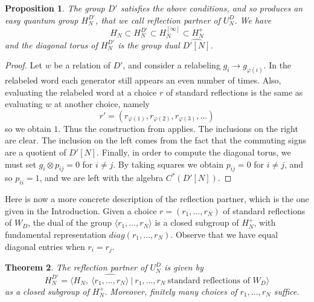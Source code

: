 \documentclass[11pt,a4paper]{article}
\newtheorem{thm}{Theorem}[section]
\newtheorem{prop}[thm]{Proposition}
\begin{document}
\begin{prop}\label{partner-exists}
The group $D'$ satisfies the above conditions, and so produces an easy quantum group $H_N^{D'}$, that we call reflection partner of $U_N^D$. We have
\[
 H_N\subset H_N^{D'}\subset H_N^{[\infty]}\subset H_N^+
\]
and the diagonal torus of $H_N^{D'}$ is the group dual $\widehat{D'[N]}$.
\end{prop}

\begin{proof}
Let $w$ be a relation of $D'$, and consider a relabeling $g_i\to g_{\varphi(i)}$. In the relabeled word each generator still appears an even number of times. Also, evaluating the relabeled word at a choice $r$ of standard reflections is the same as evaluating $w$ at another choice, namely
\[
 r'=(r_{\varphi(1)},r_{\varphi(2)},r_{\varphi(3)},\ldots)
\]
so we obtain $1$. Thus the construction from \cite{rw} applies. The inclusions on the right are clear. The inclusion on the left comes from the fact that the commuting signs are a quotient of $D'[N]$. Finally, in order to compute the diagonal torus, we must set $g_i\otimes p_{ij}=0$ for $i\neq j$. By taking squares we obtain $p_{ij}=0$ for $i\neq j$, and so $p_{ii}=1$, and we are left with the algebra $C^*(D'[N])$.
\end{proof}

Here is now a more concrete description of the reflection partner, which is the one given in the Introduction. Given a choice $r=(r_1,\ldots,r_N)$ of standard reflections of $W_D$, the dual of the group $\langle r_1,\ldots,r_N\rangle$ is a closed subgroup of $H_N^+$, with fundamental representation $diag(r_1,\ldots,r_N)$. Observe that we have equal diagonal entries when $r_i=r_j$.

\begin{thm}\label{generation}
The reflection partner of $U_N^D$ is given by
\[
 H_N^{D'}=\Big\langle H_N,\ \widehat{\langle r_1,\ldots,r_N\rangle}\ \Big|\ r_1,\ldots,r_N\ \text{standard reflections of }W_D\Big\rangle
\]
as a closed subgroup of $H_N^+$. Moreover, finitely many choices of $r_1,\ldots,r_N$ suffice.
\end{thm}
\end{document}

